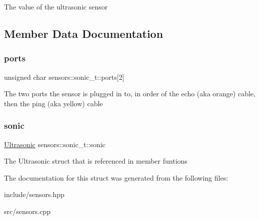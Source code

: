 The value of the ultrasonic sensor 

\subsection{Member Data Documentation}
\mbox{\label{structsensors_1_1sonic__t_a64b68ab2ff696f95714dad492ea30939}} 
\subsubsection{\texorpdfstring{ports}{ports}}
{\footnotesize\ttfamily unsigned char sensors\+::sonic\+\_\+t\+::ports\mbox{[}2\mbox{]}}

The two ports the sensor is plugged in to, in order of the echo (aka orange) cable, then the ping (aka yellow) cable \mbox{\label{structsensors_1_1sonic__t_ac84ca5638a8dc7156d90937eb228ed18}} 
\subsubsection{\texorpdfstring{sonic}{sonic}}
{\footnotesize\ttfamily \hyperlink{API_8h_a527ee5b64142c3505d6931d8ed7ac6b7}{Ultrasonic} sensors\+::sonic\+\_\+t\+::sonic}

The Ultrasonic struct that is referenced in member funtions 

The documentation for this struct was generated from the following files\+:\begin{DoxyCompactItemize}
\item 
include/sensors.\+hpp\item 
src/sensors.\+cpp\end{DoxyCompactItemize}
